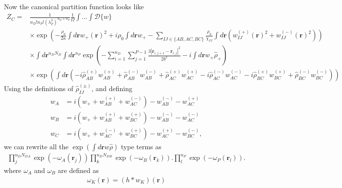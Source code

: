 \documentclass{article}
\begin{document}
Now the canonical partition function looks like
\begin{align*}
  Z_C =& \frac{1}{n_D!n_P! \left( \lambda_T^3 \right)^{n_D+n_P}}
    \frac{1}{\Omega}
    \int \hdots \int \mathcal{D} \{w\} \\
    &\times
    \exp \left(
      - \frac{\rho_0}{2\kappa} \int d \mathbf{r} w_+(\mathbf{r})^2
      + i \rho_0 \int d\mathbf{r} w_+
      - \sum_{IJ \in \{AB,AC,BC\}}
      \frac{\rho_0}{\chi_{IJ}}
      \int d \mathbf{r}
      \left(
        w_{IJ}^{(+)} (\mathbf{r})^2 + w_{IJ}^{(-)} (\mathbf{r})^2
      \right)
    \right) \\
    &\times \int d \mathbf{r}^{n_DN_D} \int d \mathbf{r}^{n_P}
    \exp \left(
      - \sum_{i=1}^{n_D}    \sum_{j=1}^{P-1}
      \frac{3 \left| \mathbf{r}_{i,j+1} - \mathbf{r}_{i,j} \right| ^ 2 }
           { 2 b^2 }
      - i\int d \mathbf{r} w_+ \hat{\rho}_+
    \right) \\
    &\times
    \exp \left(
      \int d \mathbf{r} \left(
        -i \hat{\rho}_{AB}^{(+)} w_{AB}^{(+)}
        + \hat{\rho}_{AB}^{(-)} w_{AB}^{(-)}
        + \hat{\rho}_{AC}^{(+)} w_{AC}^{(+)}
        -i \hat{\rho}_{AC}^{(-)} w_{AC}^{(-)}
        -i \hat{\rho}_{BC}^{(+)} w_{BC}^{(+)}
        + \hat{\rho}_{BC}^{(-)} w_{BC}^{(-)}
      \right)
    \right)
\end{align*}
Using the definitions of $\hat{\rho}_{IJ}^{(\pm)}$, and defining
\begin{align*}
  w_A &=
    i \left( w_+ + w_{AB}^{(+)} + w_{AC}^{(-)} \right)
    - w_{AB}^{(-)} - w_{AC}^{(+)} \\
  w_B &=
    i \left( w_+ + w_{AB}^{(+)} + w_{BC}^{(+)} \right)
    - w_{AB}^{(-)} - w_{AC}^{(-)} \\
  w_C &=
    i \left( w_+ + w_{AC}^{(-)} + w_{BC}^{(+)} \right)
    - w_{AC}^{(+)} - w_{BC}^{(-)},
\end{align*}
  we can rewrite all the $\exp(\int d \mathbf{r} w\hat{\rho})$ type terms as
\begin{align*}
  \prod_{j}^{n_{D}N_{DA}}
  \exp \left( -\omega_A(\mathbf{r}_j) \right)
  \prod_{k}^{n_{D}N_{DB}}
  \exp \left( -\omega_B(\mathbf{r}_k) \right).
  \prod_{l}^{n_P}
  \exp \left( -\omega_P(\mathbf{r}_l) \right).
\end{align*}
where $\omega_A$ and $\omega_B$ are defined as
\begin{align*}
  \omega_K(\mathbf{r}) = (h \ast w_K)(\mathbf{r})
\end{align*}
\end{document}
